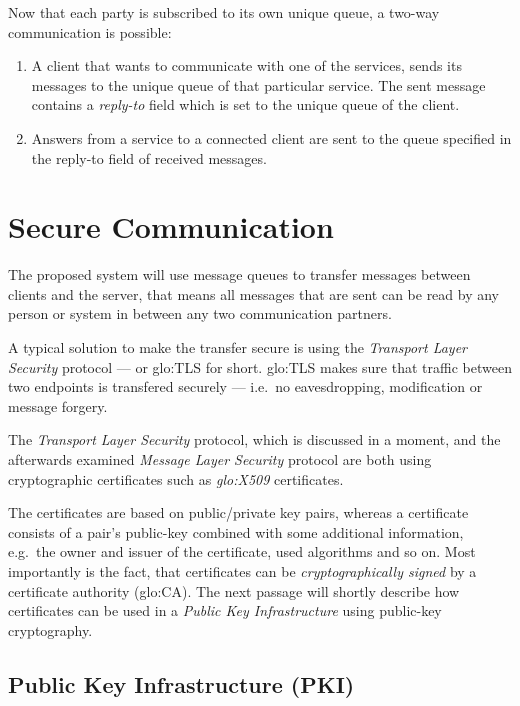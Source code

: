 Now  that each  party is  subscribed to  its own  unique queue,  a two-way
communication is possible:
\begin{enumerate}
\item A client  that wants to communicate with one  of the services, sends
  its messages  to the unique queue  of that particular  service. The sent
  message  contains a  \emph{reply-to} field  which is  set to  the unique
  queue of the client.
\item Answers from  a service to a connected client are  sent to the queue
  specified in the reply-to field of received messages.
\end{enumerate}

\section{Secure Communication}
\label{sec:secure-communication}

The proposed system  will use message queues to  transfer messages between
clients and the server, that means  all messages that are sent can be read
by any person or system in between any two communication partners. 

A   typical  solution   to  make   the  transfer   secure  is   using  the
\emph{Transport Layer  Security} protocol --- or  \gls{glo:TLS} for short.
\gls{glo:TLS} makes sure that  traffic between two endpoints is transfered
securely --- i.e.~no eavesdropping, modification or message forgery.

The  \emph{Transport Layer  Security} protocol,  which is  discussed  in a
moment, and the afterwards examined \emph{Message Layer Security} protocol
are  both using cryptographic  certificates such  as \emph{\gls{glo:X509}}
certificates.

The  certificates  are  based  on  public/private  key  pairs,  whereas  a
certificate consists of a  pair's public-key combined with some additional
information, e.g.~the owner and issuer of the certificate, used algorithms
and  so  on.  Most  importantly  is the  fact,  that  certificates can  be
\emph{cryptographically    signed}     by    a    certificate    authority
(\gls{glo:CA}). The  next passage  will shortly describe  how certificates
can  be  used  in  a  \emph{Public Key  Infrastructure}  using  public-key
cryptography.

\subsection[Public Key Infrastructure]{Public Key Infrastructure (PKI)}

